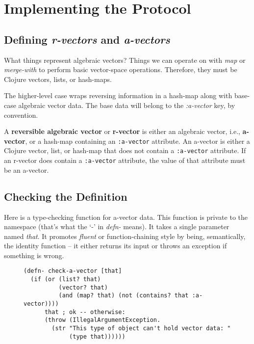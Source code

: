 \documentclass[11pt]{article}
\begin{document}
\section{Implementing the Protocol}
\label{sec-4}

\subsection{Defining \emph{r-vectors} and \emph{a-vectors}}
\label{sec-4-1}

What things represent algebraic vectors?  Things we can operate on
with \emph{map} or \emph{merge-with} to perform basic vector-space operations.
Therefore, they must be Clojure vectors, lists, or hash-maps.

The higher-level case wraps reversing information in a hash-map along
with base-case algebraic vector data. The base data will belong to
the \emph{\mbox{:a-vector}} key, by convention.


\begin{mydefinition}
   A \textbf{reversible algebraic vector} or \textbf{r-vector} is either
   an algebraic vector, i.e., \textbf{a-vector}, or a hash-map containing
   an \texttt{:a-vector} attribute. An a-vector is either a Clojure
   vector, list, or hash-map that does not contain a \mbox{\texttt{:a-vector}}
   attribute. If an r-vector does contain a \texttt{:a-vector}
   attribute, the value of that attribute must be an a-vector.
\end{mydefinition}
\subsection{Checking the Definition}
\label{sec-4-2}

Here is a type-checking function for a-vector data. This function is
private to the namespace (that's what the `-' in \emph{defn-} means).  It
takes a single parameter named \emph{that}. It promotes \emph{fluent} or
function-chaining style by being, semantically, the identity function
-- it either returns its input or throws an exception if something is
wrong.

\begin{figure}[H]
\label{check-a-vector}
\begin{verbatim}
(defn- check-a-vector [that]
  (if (or (list? that)
          (vector? that)
          (and (map? that) (not (contains? that :a-vector))))
      that ; ok -- otherwise:
      (throw (IllegalArgumentException.
        (str "This type of object can't hold vector data: "
             (type that))))))
\end{verbatim}
\end{figure}
\end{document}
